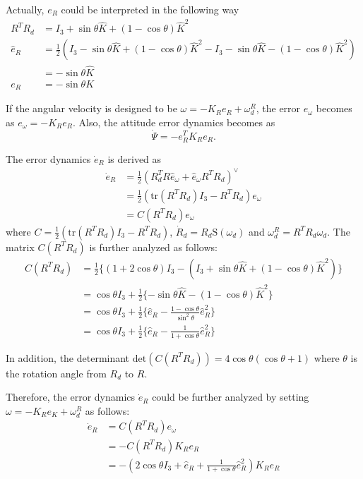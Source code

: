 \documentclass{article}
\begin{document}
Actually, $e_R$ could be interpreted in the following way
\begin{align}
R^TR_d &= I_3 + \sin\theta \hat{K} + (1-\cos\theta)\hat{K}^2 \nonumber \\
\hat{e}_R &= \frac{1}{2} (I_3 - \sin\theta \hat{K} + (1-\cos\theta)\hat{K}^2 - I_3 - \sin\theta \hat{K} -(1-\cos\theta)\hat{K}^2) \nonumber \\
&= -\sin\theta\hat{K} \nonumber \\
e_R &= -\sin\theta K \nonumber
\end{align}

If the angular velocity is designed to be $\omega = -K_Re_R + \omega_d^R$, the error $e_\omega$ becomes as $e_\omega = -K_Re_R$. Also, the attitude error dynamics becomes as
\begin{equation}
\dot{\Psi} = -e_R^TK_Re_R. \nonumber
\end{equation}

The error dynamics $\dot{e}_R$ is derived as
\begin{align}
\dot{e}_R &= \frac{1}{2}(R_d^T R \hat{e}_\omega +\hat{e}_\omega R^T R_d)^\vee \nonumber \\
&= \frac{1}{2}(\text{tr}(R^TR_d)I_3 - R^TR_d)e_\omega \nonumber \\
&= C(R^TR_d)e_\omega \nonumber
\end{align}
where $C =  \frac{1}{2}(\text{tr}(R^TR_d)I_3 - R^TR_d)$, $\dot{R}_d = R_d\text{S}(\omega_d)$ and $\omega_d^R = R^TR_d\omega_d$. 
The matrix $C(R^TR_d)$ is further analyzed as follows:
\begin{align}
C(R^TR_d) &= \frac{1}{2}\{(1+2\cos\theta)I_3 - (I_3 + \sin\theta\hat{K} + (1-\cos\theta)\hat{K}^2)\} \nonumber \\
&= \cos\theta I_3 +\frac{1}{2}\{-\sin\theta\hat{K} - (1-\cos\theta)\hat{K}^2\} \nonumber \\
&= \cos\theta I_3 +\frac{1}{2}\{ \hat{e}_R -\frac{1-\cos\theta}{\sin^2\theta}\hat{e}_R^2\} \nonumber \\
&= \cos\theta I_3 +\frac{1}{2}\{ \hat{e}_R -\frac{1}{1+\cos\theta}\hat{e}_R^2\} \nonumber
\end{align}

In addition, the determinant $\text{det}(C(R^TR_d)) = 4\cos\theta(\cos\theta + 1)$ where $\theta$ is the rotation angle from $R_d$ to $R$.

Therefore, the error dynamics $\dot{e}_R$ could be further analyzed by setting $\omega = -K_Re_K + \omega_d^R$ as follows:
\begin{align}
\dot{e}_R &= C(R^TR_d)e_\omega \nonumber \\
&= -C(R^TR_d)K_Re_R \nonumber \\
&= -(2\cos\theta I_3 + \hat{e}_R + \frac{1}{1+\cos\theta}\hat{e}_R^2)K_Re_R \nonumber
\end{align}
\end{document}
